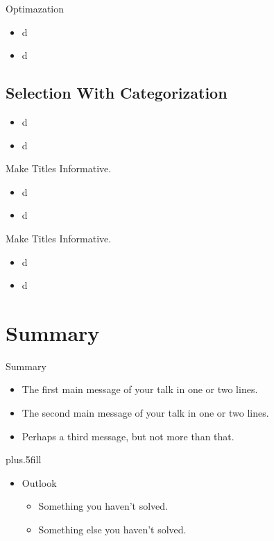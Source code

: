 \documentclass{beamer}
\begin{document}
\begin{frame}{Optimazation}
    \begin{itemize}
    \item
       d
    \item
        d
    \end{itemize}
\end{frame}


\subsection{Selection With Categorization}


\begin{frame}{}
    \begin{itemize}
    \item
       d
    \item
        d
    \end{itemize}
\end{frame}

\begin{frame}{Make Titles Informative.}
    \begin{itemize}
    \item
       d
    \item
        d
    \end{itemize}
\end{frame}

\begin{frame}{Make Titles Informative.}
    \begin{itemize}
    \item
       d
    \item
        d
    \end{itemize}
\end{frame}



\section*{Summary}

\begin{frame}{Summary}
  \begin{itemize}
  \item
    The \alert{first main message} of your talk in one or two lines.
  \item
    The \alert{second main message} of your talk in one or two lines.
  \item
    Perhaps a \alert{third message}, but not more than that.
  \end{itemize}
  \vskip0pt plus.5fill
  \begin{itemize}
  \item
    Outlook
    \begin{itemize}
    \item
      Something you haven't solved.
    \item
      Something else you haven't solved.
    \end{itemize}
  \end{itemize}
\end{frame}
\end{document}
